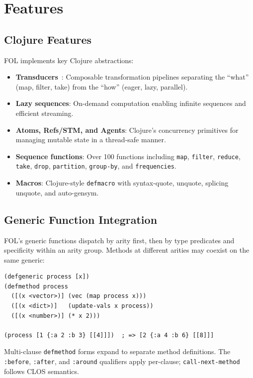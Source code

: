 \documentclass[sigconf,nonacm,review]{acmart}
\begin{document}
\section{Features}

\subsection{Clojure Features}

FOL implements key Clojure abstractions:

\begin{itemize}
\item \textbf{Transducers}~\cite{Hickey2014}: Composable transformation pipelines separating the ``what'' (map, filter, take) from the ``how'' (eager, lazy, parallel).
\item \textbf{Lazy sequences}: On-demand computation enabling infinite sequences and efficient streaming.
\item \textbf{Atoms, Refs/STM, and Agents}: Clojure's concurrency primitives for managing mutable state in a thread-safe manner.
\item \textbf{Sequence functions}: Over 100 functions including \texttt{map}, \texttt{filter}, \texttt{reduce}, \texttt{take}, \texttt{drop}, \texttt{partition}, \texttt{group-by}, and \texttt{frequencies}.
\item \textbf{Macros}: Clojure-style \texttt{defmacro} with syntax-quote, unquote, splicing unquote, and auto-gensym.
\end{itemize}

\subsection{Generic Function Integration}

FOL's generic functions dispatch by arity first, then by type predicates and specificity within an arity group. Methods at different arities may coexist on the same generic:

\begin{lstlisting}
(defgeneric process [x])
(defmethod process
  ([(x <vector>)] (vec (map process x)))
  ([(x <dict>)]   (update-vals x process))
  ([(x <number>)] (* x 2)))

(process [1 {:a 2 :b 3} [[4]]])  ; => [2 {:a 4 :b 6} [[8]]]
\end{lstlisting}

Multi-clause \texttt{defmethod} forms expand to separate method definitions. The \texttt{:before}, \texttt{:after}, and \texttt{:around} qualifiers apply per-clause; \texttt{call-next-method} follows CLOS semantics.
\end{document}

